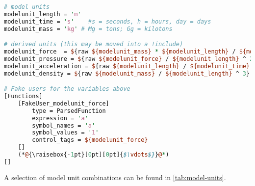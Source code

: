 \begin{lstlisting}[language=perl, caption={Set of consistent physical units in a Moose inut file},label={patterns-physical-unit-set}]
# model units
modelunit_length = 'm'
modelunit_time = 's'    #s = seconds, h = hours, day = days
modelunit_mass = 'kg' # Mg = tons; Gg = kilotons

# derived units (this may be moved into a !include)
modelunit_force  = ${raw ${modelunit_mass} * ${modelunit_length} / ${modelunit_time} ^ 2}
modelunit_pressure = ${raw ${modelunit_force} / ${modelunit_length} ^ 2}
modelunit_acceleration = ${raw ${modelunit_length} / ${modelunit_time} ^ 2}
modelunit_density = ${raw ${modelunit_mass} / ${modelunit_length} ^ 3}

# Fake users for the variables above
[Functions]
    [FakeUser_modelunit_force]
        type = ParsedFunction
        expression = 'a'
        symbol_names = 'a'
        symbol_values = '1'
        control_tags = ${modelunit_force}
    []
    (*@{\raisebox{-1pt}[0pt][0pt]{$\vdots$}}@*)
[]
\end{lstlisting}

A selection of model unit combinations can be found in
\autoref{tab:model-units}.

